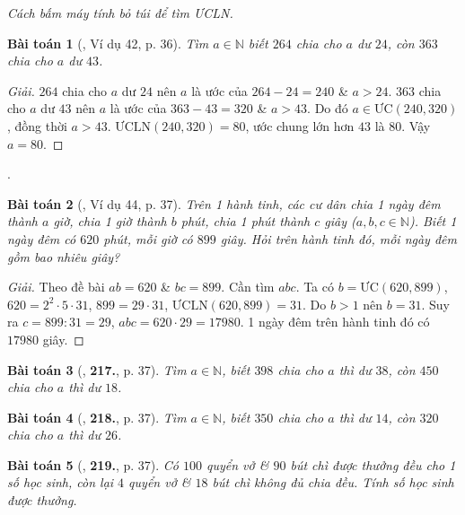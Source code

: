 \documentclass{article}
\numberwithin{equation}{section}
\newtheorem{baitoan}{Bài toán}[section]
\begin{document}
\textit{Cách bấm máy tính bỏ túi để tìm ƯCLN.}

\begin{baitoan}[\cite{Binh_Toan_6_tap_1}, Ví dụ 42, p. 36]
	Tìm $a\in\mathbb{N}$ biết $264$ chia cho $a$ dư $24$, còn $363$ chia cho $a$ dư $43$.
\end{baitoan}

\begin{proof}[Giải]
	$264$ chia cho $a$ dư $24$ nên $a$ là ước của $264 - 24 = 240$ \& $a > 24$. $363$ chia cho $a$ dư $43$ nên $a$ là ước của $363 - 43 = 320$ \& $a > 43$. Do đó $a\in\mbox{ƯC}(240,320)$, đồng thời $a > 43$. $\mbox{ƯCLN}(240,320) = 80$, ước chung lớn hơn $43$ là $80$. Vậy $a = 80$.
\end{proof}
\cite[Ví dụ 43, p. 37]{Binh_Toan_6_tap_1}.

\begin{baitoan}[\cite{Binh_Toan_6_tap_1}, Ví dụ 44, p. 37]
	Trên 1 hành tinh, các cư dân chia 1 ngày đêm thành $a$ giờ, chia 1 giờ thành $b$ phút, chia 1 phút thành $c$ giây ($a,b,c\in\mathbb{N}$). Biết 1 ngày đêm có $620$ phút, mỗi giờ có $899$ giây. Hỏi trên hành tinh đó, mỗi ngày đêm gồm bao nhiêu giây?
\end{baitoan}

\begin{proof}[Giải]
	Theo đề bài $ab = 620$ \& $bc = 899$. Cần tìm $abc$. Ta có $b = \mbox{ƯC}(620,899)$, $620 = 2^2\cdot 5\cdot 31$, $899 = 29\cdot 31$, $\mbox{ƯCLN}(620,899) = 31$. Do $b > 1$ nên $b = 31$. Suy ra $c = 899:31 = 29$, $abc = 620\cdot 29 = 17980$. 1 ngày đêm trên hành tinh đó có $17980$ giây.
\end{proof}

\begin{baitoan}[\cite{Binh_Toan_6_tap_1}, \textbf{217.}, p. 37]
	Tìm $a\in\mathbb{N}$, biết $398$ chia cho $a$ thì dư $38$, còn $450$ chia cho $a$ thì dư $18$.
\end{baitoan}

\begin{baitoan}[\cite{Binh_Toan_6_tap_1}, \textbf{218.}, p. 37]
	Tìm $a\in\mathbb{N}$, biết $350$ chia cho $a$ thì dư $14$, còn $320$ chia cho $a$ thì dư $26$.
\end{baitoan}

\begin{baitoan}[\cite{Binh_Toan_6_tap_1}, \textbf{219.}, p. 37]
	Có $100$ quyển vở \& $90$ bút chì được thưởng đều cho 1 số học sinh, còn lại $4$ quyển vở \& $18$ bút chì không đủ chia đều. Tính số học sinh được thưởng.
\end{baitoan}
\end{document}
